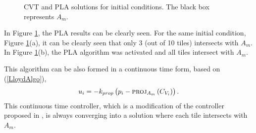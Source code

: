 \documentclass{iacas}
\begin{document}
\begin{figure}
	\captionsetup[subfigure]{position=b}
	\centering
	\caption{CVT and PLA solutions for initial conditions. The black box represents $A_m$.}
\label{fig:projected lloyds algorithm}
\end{figure}

In Figure \ref{fig:projected lloyds algorithm}, the PLA results can be clearly seen. For the same initial condition, Figure \ref{fig:projected lloyds algorithm}(a), it can be clearly seen that only 3 (out of 10 tiles) intersects with $A_m$. In Figure \ref{fig:projected lloyds algorithm}(b), the PLA algorithm was activated and all tiles intersect with $A_m$.

This algorithm can be also formed in a continuous time form, based on (\ref{LloydAlgo}), %
\begin{equation} \label{eq:PLA continuous time controller}
u_{i} = -k_{prop}\left( p_i - \textsc{proj}_{A_m}\left( C_{V_{i}} \right) \right).
\end{equation}
This continuous time controller, which is a modification of the controller proposed in \cite{Cortes2004}, is always converging into a solution where each tile intersects with $A_m$.
\end{document}
